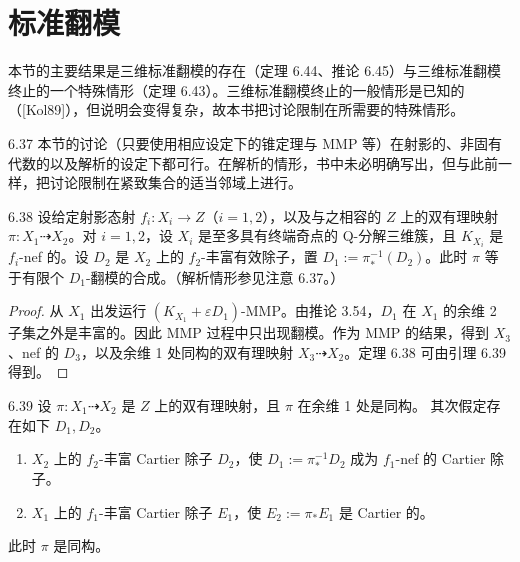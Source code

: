 \section{标准翻模}

本节的主要结果是三维标准翻模的存在（定理 6.44、推论 6.45）与三维标准翻模终止的一个特殊情形（定理 6.43）。三维标准翻模终止的一般情形是已知的（[Kol89]），但说明会变得复杂，故本书把讨论限制在所需要的特殊情形。

\begin{remark}{6.37}
本节的讨论（只要使用相应设定下的锥定理与 MMP 等）在射影的、非固有代数的以及解析的设定下都可行。在解析的情形，书中未必明确写出，但与此前一样，把讨论限制在紧致集合的适当邻域上进行。
\end{remark}


\begin{theoremp}{6.38}
设给定射影态射 $f_i:X_i\to Z$（$i=1,2$），以及与之相容的 $Z$ 上的双有理映射 $\pi:X_1\dashrightarrow X_2$。对 $i=1,2$，设 $X_i$ 是至多具有终端奇点的 Q-分解三维簇，且 $K_{X_i}$ 是 $f_i$-nef 的。设 $D_2$ 是 $X_2$ 上的 $f_2$-丰富有效除子，置 $D_1:=\pi_*^{-1}(D_2)$。此时 $\pi$ 等于有限个 $D_1$-翻模的合成。（解析情形参见注意 6.37。）
\end{theoremp}

\begin{proof}
从 $X_1$ 出发运行 $(K_{X_1}+\varepsilon D_1)$-MMP。由推论 3.54，$D_1$ 在 $X_1$ 的余维 2 子集之外是丰富的。因此 MMP 过程中只出现翻模。作为 MMP 的结果，得到 $X_3$、nef 的 $D_3$，以及余维 1 处同构的双有理映射 $X_3\dashrightarrow X_2$。定理 6.38 可由引理 6.39 得到。
\end{proof}

\begin{lemmap}{6.39}
设 $\pi:X_1\dashrightarrow X_2$ 是 $Z$ 上的双有理映射，且 $\pi$ 在余维 1 处是同构。
其次假定存在如下 $D_1,D_2$。
\begin{enumerate}[label=（\arabic*）,leftmargin=3.2em]
\item $X_2$ 上的 $f_2$-丰富 Cartier 除子 $D_2$，使 $D_1:=\pi_*^{-1}D_2$ 成为 $f_1$-nef 的 Cartier 除子。
\item $X_1$ 上的 $f_1$-丰富 Cartier 除子 $E_1$，使 $E_2:=\pi_*E_1$ 是 Cartier 的。
\end{enumerate}
此时 $\pi$ 是同构。
\end{lemmap}

